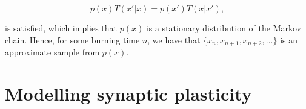 \begin{equation}
    p(x)T(x'|x) = p(x')T(x|x'),
\end{equation} 

is satisfied, which implies that $p(x)$ is a stationary distribution of the Markov chain. Hence, for some burning time $n$, we have that $\{x_n, x_{n+1}, x_{n+2},...\}$ is an approximate sample from $p(x)$.








\section{Modelling synaptic plasticity}
\label{sec:SP}

